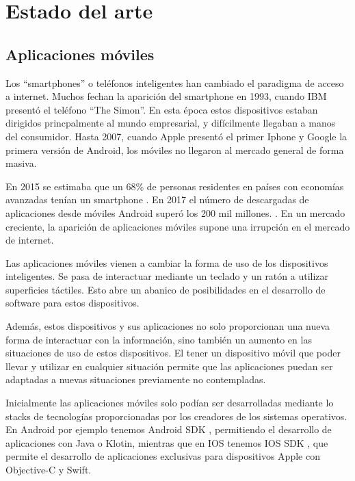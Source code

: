 \chapter{Estado del arte}

\section{Aplicaciones móviles}

Los ``smartphones'' o teléfonos inteligentes han cambiado el paradigma de acceso a internet. Muchos fechan la aparición del smartphone en 1993, cuando IBM presentó el teléfono ``The Simon''. En esta época estos dispositivos estaban dirigidos princpalmente al mundo empresarial, y difícilmente llegaban a manos del consumidor. Hasta 2007, cuando Apple presentó el primer Iphone y Google la primera versión de Android, los móviles no llegaron al mercado general de forma masiva. \cite{sarwar2013impact}

En 2015 se estimaba que un 68\% de personas residentes en países con economías avanzadas tenían un smartphone \cite{poushter2016smartphone}. En 2017 el número de descargadas de aplicaciones desde móviles Android superó los 200 mil millones. \cite{10.1145/3278532.3278558}. En un mercado creciente, la aparición de aplicaciones móviles supone una irrupción en el mercado de internet.

Las aplicaciones móviles vienen a cambiar la forma de uso de los dispositivos inteligentes. Se pasa de interactuar mediante un teclado y un ratón a utilizar superficies táctiles. Esto abre un abanico de posibilidades en el desarrollo de software para estos dispositivos.

Además, estos dispositivos y sus aplicaciones no solo proporcionan una nueva forma de interactuar con la información, sino también un aumento en las situaciones de uso de estos dispositivos. El tener un dispositivo móvil que poder llevar y utilizar en cualquier situación permite que las aplicaciones puedan ser adaptadas a nuevas situaciones previamente no contempladas. 

Inicialmente las aplicaciones móviles solo podían ser desarrolladas mediante lo stacks de tecnologías proporcionadas por los creadores de los sistemas operativos. En Android por ejemplo tenemos Android SDK \cite{android-sdk}, permitiendo el desarrollo de aplicaciones con Java o Klotin, mientras que en IOS tenemos IOS SDK \cite{ios-sdk}, que permite el desarrollo de aplicaciones exclusivas para dispositivos Apple con Objective-C y Swift.

